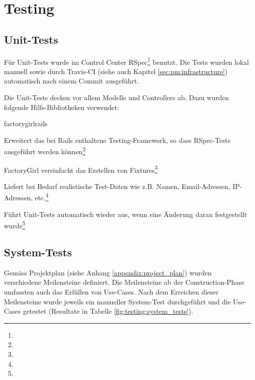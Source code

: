 \section{Testing} \label{sec:umsetzung:testing}

\subsection*{Unit-Tests}

Für Unit-Tests wurde im Control Center RSpec\footnote{} benutzt. Die Tests wurden lokal manuell sowie durch Travis-CI (siehe auch Kapitel \ref{sec:pm:infrastructure}) automatisch nach einem Commit ausgeführt.

Die Unit-Tests decken vor allem Modelle und Controllers ab. Dazu wurden folgende Hilfs-Bibliotheken verwendet:

\begin{labeling}{factory\textunderscore girl\textunderscore rails}
    \item [rspec-rails] Erweitert das bei Rails enthaltene Testing-Framework, so dass RSpec-Tests ausgeführt werden können\footnote{}
    \item [factory\textunderscore girl\textunderscore rails] FactoryGirl vereinfacht das Erstellen von Fixtures\footnote{}
    \item [faker] Liefert bei Bedarf realistische Test-Daten wie z.B. Namen, Email-Adressen, IP-Adressen, etc.\footnote{}
    \item [guard-rspec] Führt Unit-Tests automatisch wieder aus, wenn eine Änderung daran festgestellt wurde\footnote{}
\end{labeling}

\subsection*{System-Tests}

Gemäss Projektplan (siehe Anhang \ref{appendix:project_plan}) wurden verschiedene Meilensteine definiert. Die Meilensteine ab der Construction-Phase umfassten auch das Erfüllen von Use-Cases. Nach dem Erreichen dieser Meilensteine wurde jeweils ein manueller System-Test durchgeführt und die Use-Cases getestet (Resultate in Tabelle \ref{fig:testing:system_tests}).

